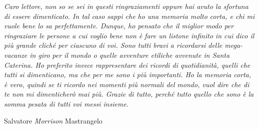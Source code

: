\separatore

\textit{Caro lettore, non so se sei in questi ringraziamenti oppure hai avuto la sfortuna di essere dimenticato. In tal caso sappi che ho una memoria molto corta, e chi mi vuole bene lo sa perfettamente. Dunque, ho pensato che il miglior modo per ringraziare le persone a cui voglio bene non è fare un listone infinito in cui dico il più grande cliché per ciascuno di voi. Sono tutti bravi a ricordarsi delle mega-vacanze in giro per il mondo o quelle avventure etiliche avvenute in Santa Caterina. Ho preferito invece rappresentare dei ricordi di quotidianità, quelli che tutti si dimenticano, ma che per me sono i più importanti. Ho la memoria corta, è vero, quindi se ti ricordo nei momenti più normali del mondo, vuol dire che di te non mi dimenticherò mai più. Grazie di tutto, perché tutto quello che sono è la somma pesata di tutti voi messi insieme.}
\vspace{10mm}

\hfill Salvatore \textit{Morrison} Mastrangelo


